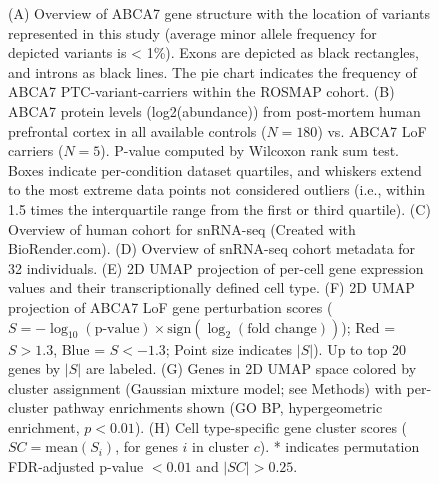 \begin{figure}[ht]
{        (A) Overview of ABCA7 gene structure with the location of variants represented in this study (average minor allele frequency for depicted variants is < 1\%). Exons are depicted as black rectangles, and introns as black lines. The pie chart indicates the frequency of ABCA7 PTC-variant-carriers within the ROSMAP cohort. 
        (B) ABCA7 protein levels (log2(abundance)) from post-mortem human prefrontal cortex in all available controls ($N=180$) vs. ABCA7 LoF carriers ($N=5$). P-value computed by Wilcoxon rank sum test. Boxes indicate per-condition dataset quartiles, and whiskers extend to the most extreme data points not considered outliers (i.e., within 1.5 times the interquartile range from the first or third quartile). 
        (C) Overview of human cohort for snRNA-seq (Created with BioRender.com). 
        (D) Overview of snRNA-seq cohort metadata for 32 individuals. 
        (E) 2D UMAP projection of per-cell gene expression values and their transcriptionally defined cell type. 
        (F) 2D UMAP projection of ABCA7 LoF gene perturbation scores ($S = -\log_{10}(\text{p-value}) \times \text{sign}(\log_2(\text{fold change}))$); Red = $S>1.3$, Blue = $S<-1.3$; Point size indicates $|S|$). Up to top 20 genes by $|S|$ are labeled. 
        (G) Genes in 2D UMAP space colored by cluster assignment (Gaussian mixture model; see Methods) with per-cluster pathway enrichments shown (GO BP, hypergeometric enrichment, $p<0.01$). 
        (H) Cell type-specific gene cluster scores ($SC = \text{mean}(S_i)$, for genes $i$ in cluster $c$). * indicates permutation FDR-adjusted p-value $< 0.01$ and $|SC| > 0.25$.
    }
    \label{fig:main_atlas}
\end{figure}